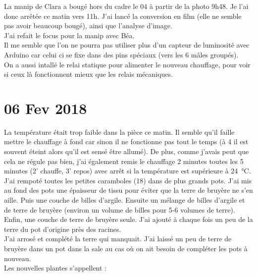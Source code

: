 \documentclass[10pt,a4paper]{article}
\begin{document}
La manip de Clara a bougé hors du cadre le 04 à partir de la photo 9h48. Je l'ai donc arrêtée ce matin vers 11h. J'ai lancé la conversion en film (elle ne semble pas avoir beaucoup bougé), ainsi que l'analyse d'image.\\

J'ai refait le focus pour la manip avec Béa.\\

Il me semble que l'on ne pourra pas utiliser plus d'un capteur de luminosité avec Arduino car celui ci se fixe dans des pins spéciaux (vers les 6 mâles groupés).\\

On a aussi intallé le relai statique pour alimenter le nouveau chauffage, pour voir si ceux là fonctionnent mieux que les relais mécaniques.

\section{06 Fev 2018}
La température était trop faible dans la pièce ce matin. Il semble qu'il faille mettre le chauffage à fond car sinon il ne fonctionne pas tout le temps (à 4 il est souvent éteint alors qu'il est sensé être allumé). De plus, comme j'avais peut que cela ne régule pas bien, j'ai également remis le chauffage 2 minutes toutes les 5 minutes (2' chauffe, 3' repos) avec arrêt si la température est supérieure à \SI{24}{\celsius}.\\

J'ai rempoté toutes les petites caramboles (18) dans de plus grands pots. J'ai mis au fond des pots une épaisseur de tissu pour éviter que la terre de bruyère ne s'en aille. Puis une couche de billes d'argile. Ensuite un mélange de billes d'argile et de terre de bruyère (environ un volume de billes pour 5-6 volumes de terre). Enfin, une couche de terre de bruyère seule. J'ai ajouté à chaque fois un peu de la terre du pot d'origine près des racines.\\ J'ai arrosé et complété la terre qui manquait. J'ai laissé un peu de terre de bruyère dans un pot dans la sale au cas où on ait besoin de compléter les pots à nouveau.\\
Les nouvelles plantes s'appellent :
\end{document}
